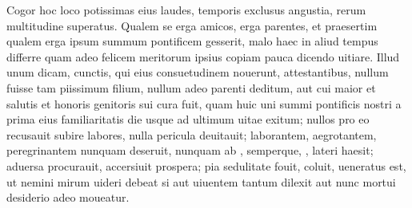 \documentclass[a5paper,twoside]{article}
\begin{document}
\begin{pages}
\begin{Leftside}
\pend
\pstart
Cogor hoc loco potissimas eius  laudes,  temporis exclusus angustia,   rerum multitudine superatus.  Qualem se erga amicos,  erga parentes, et praesertim qualem erga ipsum summum pontificem gesserit, malo haec  in aliud tempus differre quam adeo felicem meritorum ipsius copiam pauca dicendo uitiare.  Illud unum dicam, cunctis, qui eius consuetudinem nouerunt, attestantibus, nullum fuisse tam piissimum filium, nullum adeo parenti deditum, aut cui maior et salutis et honoris genitoris sui cura fuit, quam huic uni summi pontificis nostri a prima eius familiaritatis die usque ad ultimum uitae exitum; nullos pro eo recusauit subire labores, nulla pericula deuitauit; laborantem, aegrotantem, peregrinantem nunquam deseruit, nunquam ab  , semperque, , lateri haesit; aduersa procurauit, accersiuit prospera; pia sedulitate fouit, coluit, ueneratus est, ut nemini mirum uideri debeat si aut uiuentem tantum dilexit aut nunc mortui desiderio adeo moueatur.
\pend
\pstart

\end{Leftside}
\end{pages}
\end{document}
